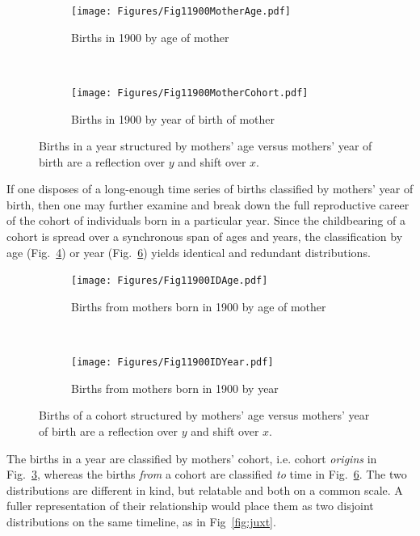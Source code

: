 \documentclass{article}
\begin{document}
\begin{figure}[ht!]
\begin{subfigure}[t]{0.5\textwidth}
        \centering
        \texttt{[image: Figures/Fig11900MotherAge.pdf]}
        \caption{Births in 1900 by age of mother}
        \label{fig:agemother}
\end{subfigure}
~
\begin{subfigure}[t]{0.5\textwidth}
        \centering
        \texttt{[image: Figures/Fig11900MotherCohort.pdf]}
        \caption{Births in 1900 by year of birth of mother}
          \label{fig:cohmother}
\end{subfigure}
\caption{Births in a year structured by mothers' age versus mothers' year of birth are a
reflection over $y$ and shift over $x$.}
\end{figure}

If one disposes of a long-enough time series of births classified by mothers' year of birth, then one may further examine and break down the full reproductive career of the cohort of individuals born in a particular year. Since the childbearing of a cohort is spread over a synchronous span of ages and years, the classification by age (Fig.~\ref{fig:age1900mother}) or year (Fig.~\ref{fig:year1900}) yields identical and redundant distributions.

\begin{figure}[ht!]
\begin{subfigure}[t]{0.5\textwidth}
        \centering
        \texttt{[image: Figures/Fig11900IDAge.pdf]}
        \caption{Births from mothers born in 1900 by age of mother}
        \label{fig:age1900mother}
\end{subfigure}
~
\begin{subfigure}[t]{0.5\textwidth}
        \centering
        \texttt{[image: Figures/Fig11900IDYear.pdf]}
        \caption{Births from mothers born in 1900 by year}
          \label{fig:year1900}
\end{subfigure}
\caption{Births of a cohort structured by mothers' age versus mothers' year of birth are a
reflection over $y$ and shift over $x$.}
\end{figure}

The births in a year are classified by mothers' cohort, i.e. cohort \emph{origins} in Fig.~\ref{fig:cohmother}, whereas the births \emph{from} a cohort are classified \emph{to} time in Fig.~\ref{fig:year1900}. The two distributions are different in kind, but relatable and both on a common scale. A fuller representation of their relationship would place them as two disjoint distributions on the same timeline, as in Fig~\ref{fig:juxt}.
\end{document}
